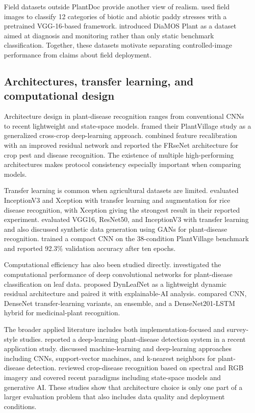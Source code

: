 \documentclass{sbc2023}%
\begin{document}
Field datasets outside PlantDoc provide another view of realism. \citet{r40} used field images to classify 12 categories of biotic and abiotic paddy stresses with a pretrained VGG-16-based framework. \citet{r41} introduced DiaMOS Plant as a dataset aimed at diagnosis and monitoring rather than only static benchmark classification. Together, these datasets motivate separating controlled-image performance from claims about field deployment.

\subsection{Architectures, transfer learning, and computational design}
Architecture design in plant-disease recognition ranges from conventional CNNs to recent lightweight and state-space models. \citet{r08} framed their PlantVillage study as a generalized cross-crop deep-learning approach. \citet{r10} combined feature recalibration with an improved residual network and reported the FRseNet architecture for crop pest and disease recognition. The existence of multiple high-performing architectures makes protocol consistency especially important when comparing models.

Transfer learning is common when agricultural datasets are limited. \citet{r17} evaluated InceptionV3 and Xception with transfer learning and augmentation for rice disease recognition, with Xception giving the strongest result in their reported experiment. \citet{r22} evaluated VGG16, ResNet50, and InceptionV3 with transfer learning and also discussed synthetic data generation using GANs for plant-disease recognition. \citet{r23} trained a compact CNN on the 38-condition PlantVillage benchmark and reported 92.3\% validation accuracy after ten epochs.

Computational efficiency has also been studied directly. \citet{r24} investigated the computational performance of deep convolutional networks for plant-disease classification on leaf data. \citet{r26} proposed DynLeafNet as a lightweight dynamic residual architecture and paired it with explainable-AI analysis. \citet{r29} compared CNN, DenseNet transfer-learning variants, an ensemble, and a DenseNet201-LSTM hybrid for medicinal-plant recognition.

The broader applied literature includes both implementation-focused and survey-style studies. \citet{r31} reported a deep-learning plant-disease detection system in a recent application study. \citet{r32} discussed machine-learning and deep-learning approaches including CNNs, support-vector machines, and k-nearest neighbors for plant-disease detection. \citet{r38} reviewed crop-disease recognition based on spectral and RGB imagery and covered recent paradigms including state-space models and generative AI. These studies show that architecture choice is only one part of a larger evaluation problem that also includes data quality and deployment conditions.
\end{document}
